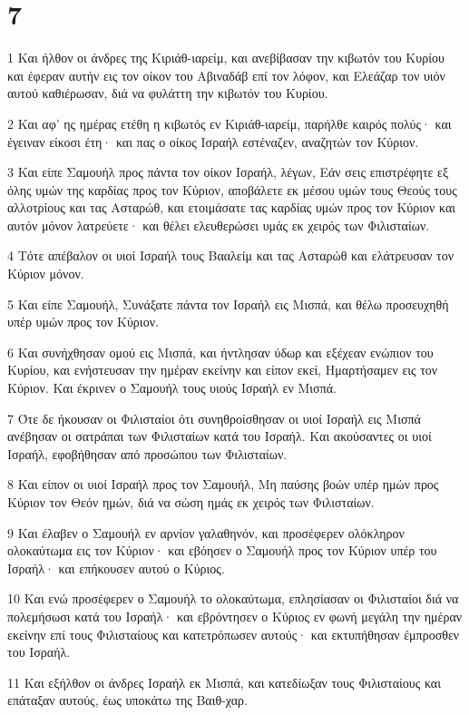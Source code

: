 \chapter{7}

\par 1 Και ήλθον οι άνδρες της Κιριάθ-ιαρείμ, και ανεβίβασαν την κιβωτόν του Κυρίου και έφεραν αυτήν εις τον οίκον του Αβιναδάβ επί τον λόφον, και Ελεάζαρ τον υιόν αυτού καθιέρωσαν, διά να φυλάττη την κιβωτόν του Κυρίου.
\par 2 Και αφ' ης ημέρας ετέθη η κιβωτός εν Κιριάθ-ιαρείμ, παρήλθε καιρός πολύς· και έγειναν είκοσι έτη· και πας ο οίκος Ισραήλ εστέναζεν, αναζητών τον Κύριον.
\par 3 Και είπε Σαμουήλ προς πάντα τον οίκον Ισραήλ, λέγων, Εάν σεις επιστρέφητε εξ όλης υμών της καρδίας προς τον Κύριον, αποβάλετε εκ μέσου υμών τους Θεούς τους αλλοτρίους και τας Ασταρώθ, και ετοιμάσατε τας καρδίας υμών προς τον Κύριον και αυτόν μόνον λατρεύετε· και θέλει ελευθερώσει υμάς εκ χειρός των Φιλισταίων.
\par 4 Τότε απέβαλον οι υιοί Ισραήλ τους Βααλείμ και τας Ασταρώθ και ελάτρευσαν τον Κύριον μόνον.
\par 5 Και είπε Σαμουήλ, Συνάξατε πάντα τον Ισραήλ εις Μισπά, και θέλω προσευχηθή υπέρ υμών προς τον Κύριον.
\par 6 Και συνήχθησαν ομού εις Μισπά, και ήντλησαν ύδωρ και εξέχεαν ενώπιον του Κυρίου, και ενήστευσαν την ημέραν εκείνην και είπον εκεί, Ημαρτήσαμεν εις τον Κύριον. Και έκρινεν ο Σαμουήλ τους υιούς Ισραήλ εν Μισπά.
\par 7 Ότε δε ήκουσαν οι Φιλισταίοι ότι συνηθροίσθησαν οι υιοί Ισραήλ εις Μισπά ανέβησαν οι σατράπαι των Φιλισταίων κατά του Ισραήλ. Και ακούσαντες οι υιοί Ισραήλ, εφοβήθησαν από προσώπου των Φιλισταίων.
\par 8 Και είπον οι υιοί Ισραήλ προς τον Σαμουήλ, Μη παύσης βοών υπέρ ημών προς Κύριον τον Θεόν ημών, διά να σώση ημάς εκ χειρός των Φιλισταίων.
\par 9 Και έλαβεν ο Σαμουήλ εν αρνίον γαλαθηνόν, και προσέφερεν ολόκληρον ολοκαύτωμα εις τον Κύριον· και εβόησεν ο Σαμουήλ προς τον Κύριον υπέρ του Ισραήλ· και επήκουσεν αυτού ο Κύριος.
\par 10 Και ενώ προσέφερεν ο Σαμουήλ το ολοκαύτωμα, επλησίασαν οι Φιλισταίοι διά να πολεμήσωσι κατά του Ισραήλ· και εβρόντησεν ο Κύριος εν φωνή μεγάλη την ημέραν εκείνην επί τους Φιλισταίους και κατετρόπωσεν αυτούς· και εκτυπήθησαν έμπροσθεν του Ισραήλ.
\par 11 Και εξήλθον οι άνδρες Ισραήλ εκ Μισπά, και κατεδίωξαν τους Φιλισταίους και επάταξαν αυτούς, έως υποκάτω της Βαιθ-χαρ.
